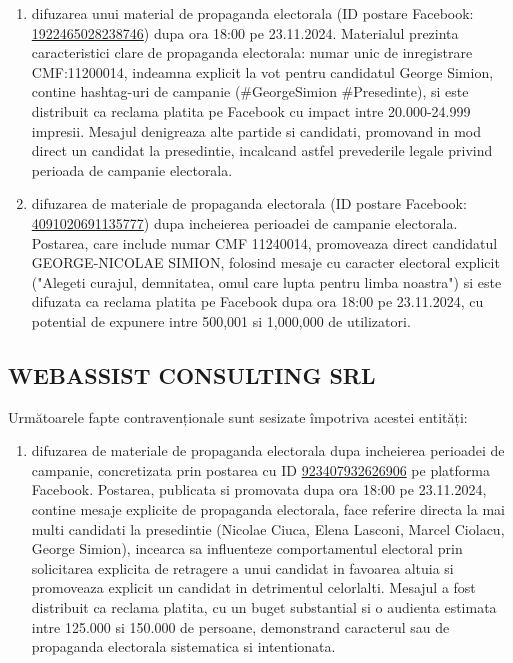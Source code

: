 \documentclass[a4paper,12pt]{article}
\begin{document}
\begin{enumerate}[leftmargin=*, label=\arabic*.)]
    \item difuzarea unui material de propaganda electorala (ID postare Facebook: \href{https://www.facebook.com/ads/library/?id=1922465028238746}{1922465028238746}) dupa ora 18:00 pe 23.11.2024. Materialul prezinta caracteristici clare de propaganda electorala: numar unic de inregistrare CMF:11200014, indeamna explicit la vot pentru candidatul George Simion, contine hashtag-uri de campanie (\#GeorgeSimion \#Presedinte), si este distribuit ca reclama platita pe Facebook cu impact intre 20.000-24.999 impresii. Mesajul denigreaza alte partide si candidati, promovand in mod direct un candidat la presedintie, incalcand astfel prevederile legale privind perioada de campanie electorala.
    \item difuzarea de materiale de propaganda electorala (ID postare Facebook: \href{https://www.facebook.com/ads/library/?id=4091020691135777}{4091020691135777}) dupa incheierea perioadei de campanie electorala. Postarea, care include numar CMF 11240014, promoveaza direct candidatul GEORGE-NICOLAE SIMION, folosind mesaje cu caracter electoral explicit ("Alegeti curajul, demnitatea, omul care lupta pentru limba noastra") si este difuzata ca reclama platita pe Facebook dupa ora 18:00 pe 23.11.2024, cu potential de expunere intre 500,001 si 1,000,000 de utilizatori.
\end{enumerate}

\vspace{0.5cm}

\subsection{WEBASSIST CONSULTING SRL}
Următoarele fapte contravenționale sunt sesizate împotriva acestei entități:

\begin{enumerate}[leftmargin=*, label=\arabic*.)]
    \item difuzarea de materiale de propaganda electorala dupa incheierea perioadei de campanie, concretizata prin postarea cu ID \href{https://www.facebook.com/ads/library/?id=923407932626906}{923407932626906} pe platforma Facebook. Postarea, publicata si promovata dupa ora 18:00 pe 23.11.2024, contine mesaje explicite de propaganda electorala, face referire directa la mai multi candidati la presedintie (Nicolae Ciuca, Elena Lasconi, Marcel Ciolacu, George Simion), incearca sa influenteze comportamentul electoral prin solicitarea explicita de retragere a unui candidat in favoarea altuia si promoveaza explicit un candidat in detrimentul celorlalti. Mesajul a fost distribuit ca reclama platita, cu un buget substantial si o audienta estimata intre 125.000 si 150.000 de persoane, demonstrand caracterul sau de propaganda electorala sistematica si intentionata.
\end{enumerate}
\end{document}
